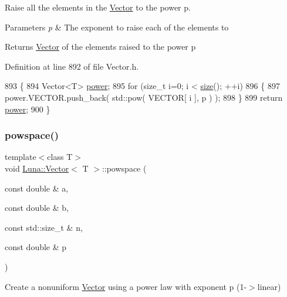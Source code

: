 Raise all the elements in the \hyperlink{classLuna_1_1Vector}{Vector} to the power p. 


\begin{DoxyParams}{Parameters}
{\em p} & The exponent to raise each of the elements to \\
\hline
\end{DoxyParams}
\begin{DoxyReturn}{Returns}
\hyperlink{classLuna_1_1Vector}{Vector} of the elements raised to the power p 
\end{DoxyReturn}


Definition at line 892 of file Vector.\+h.


\begin{DoxyCode}
893   \{
894     Vector<T> \hyperlink{classLuna_1_1Vector_ad691f671733f78bbf3bdbaf46fcbc5a0}{power};
895     \textcolor{keywordflow}{for} (\textcolor{keywordtype}{size\_t} i=0; i < \hyperlink{classLuna_1_1Vector_ac9b6ed7a0df401728f27c193fbc8f4d8}{size}(); ++i)
896     \{
897       power.VECTOR.push\_back( std::pow( VECTOR[ i ], p ) );
898     \}
899     \textcolor{keywordflow}{return} \hyperlink{classLuna_1_1Vector_ad691f671733f78bbf3bdbaf46fcbc5a0}{power};
900   \}
\end{DoxyCode}
\mbox{\label{classLuna_1_1Vector_a8073a13aaee8bf6602a543d912193626}} 
\subsubsection{\texorpdfstring{powspace()}{powspace()}\hspace{0.1cm}{\footnotesize\ttfamily [1/2]}}
{\footnotesize\ttfamily template$<$class T$>$ \\
void \hyperlink{classLuna_1_1Vector}{Luna\+::\+Vector}$<$ T $>$\+::powspace (\begin{DoxyParamCaption}\item[{const double \&}]{a,  }\item[{const double \&}]{b,  }\item[{const std\+::size\+\_\+t \&}]{n,  }\item[{const double \&}]{p }\end{DoxyParamCaption})}



Create a nonuniform \hyperlink{classLuna_1_1Vector}{Vector} using a power law with exponent p (1-\/$>$linear) 


